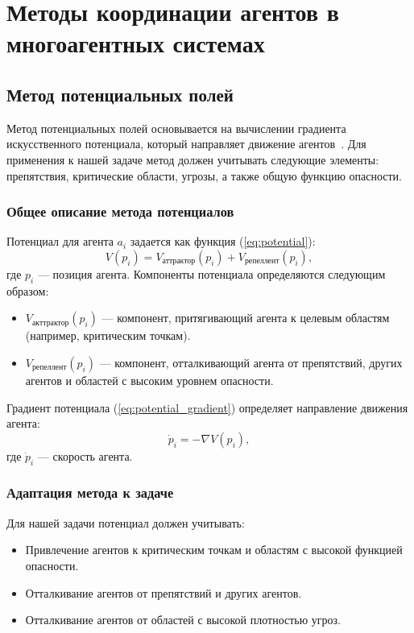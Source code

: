\section{Методы координации агентов в многоагентных системах}

\subsection{Метод потенциальных полей}
Метод потенциальных полей основывается на вычислении градиента искусственного потенциала, который направляет движение агентов~\cite{rts-potential-fields}.
Для применения к нашей задаче метод должен учитывать следующие элементы: препятствия, критические области, угрозы, а также общую функцию опасности.

\subsubsection*{Общее описание метода потенциалов}
Потенциал для агента $a_i$ задается как функция (\ref{eq:potential}):
\begin{equation}
	\label{eq:potential}
	V(p_i) = V_{\text{аттрактор}}(p_i) + V_{\text{репеллент}}(p_i),
\end{equation}
где $p_i$ — позиция агента.  
Компоненты потенциала определяются следующим образом:  
\begin{itemize}
	\item $V_{\text{акттрактор}}(p_i)$ — компонент, притягивающий агента к целевым областям (например, критическим точкам).
	\item $V_{\text{репеллент}}(p_i)$ — компонент, отталкивающий агента от препятствий, других агентов и областей с высоким уровнем опасности.
\end{itemize}

Градиент потенциала (\ref{eq:potential_gradient}) определяет направление движения агента:
\begin{equation}
	\label{eq:potential_gradient}
	\dot{p}_i = -\nabla V(p_i),
\end{equation}
где $\dot{p}_i$ — скорость агента.

\subsubsection*{Адаптация метода к задаче}
Для нашей задачи потенциал должен учитывать:
\begin{itemize}[leftmargin=1.6\parindent]
	\item Привлечение агентов к критическим точкам и областям с высокой функцией опасности.
	\item Отталкивание агентов от препятствий и других агентов.
	\item Отталкивание агентов от областей с высокой плотностью угроз.
\end{itemize}

